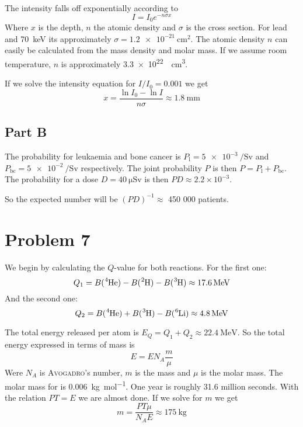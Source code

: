 \documentclass[a4paper, parskip=half, twopage]{scrartcl}
\begin{document}
The intensity falls off exponentially according to
\[
I = I_0 e^{-n \sigma x}
\]
Where $x$ is the depth, $n$ the atomic density and $\sigma$ is the cross section. For lead and \SI{70}{\keV} its approximately $\sigma = \SI{1.2e-21}{\cm^2}$. The atomic density $n$ can easily be calculated from the mass density and molar mass. If we assume room temperature, $n$ is approximately \SI{3.3e22}{\per\cubic\centi\metre}.

If we solve the intensity equation for $I/I_0 = 0.001$ we get
\[
x = \frac{\ln I_0 - \ln I}{n \sigma} \approx \SI{1.8}{\mm}
\]

\subsection*{Part B}

The probability for leukaemia and bone cancer is $P_\mathrm{l} = \SI{5e-3}{\per\sievert}$ and $P_\mathrm{bc} = \SI{5e-2}{\per\sievert}$ respectively. The joint probability $P$ is then $P = P_\mathrm{l} + P_\mathrm{bc}$. The probability for a dose $D = \SI{40}{\micro \sievert}$ is then $PD \approx 2.2 \times 10^{-3}$.

So the expected number will be $(PD)^{-1} \approx$ 450 000 patients.

\section*{Problem 7}
We begin by calculating the $Q$-value for both reactions. For the first one:
\[
Q_1 = B(\ce{^{4}He}) - B(\ce{^{2}H}) - B(\ce{^{3}H}) \approx \SI{17.6}{\MeV}
\]
And the second one:
\[
Q_2 = B(\ce{^{4}He}) + B(\ce{^{3}H}) - B(\ce{^{6}Li}) \approx \SI{4.8}{\MeV}
\]

The total energy released per  atom is $E_Q = Q_1 + Q_2 \approx \SI{22.4}{\MeV}$. So the total energy expressed in terms of mass is 
\[
E = E N_A \frac{m}{\mu}
\]
Were $N_A$ is \textsc{Avogadro}'s number, $m$ is the mass and $\mu$ is the molar mass. The molar mass for  is \SI{0.006}{\kg \per \mole}. One year is roughly 31.6 million seconds. With the relation $PT = E$ we are almost done. If we solve for $m$ we get
\[
m = \frac{P T \mu}{N_A E} \approx \SI{175}{\kg}
\]
\end{document}
